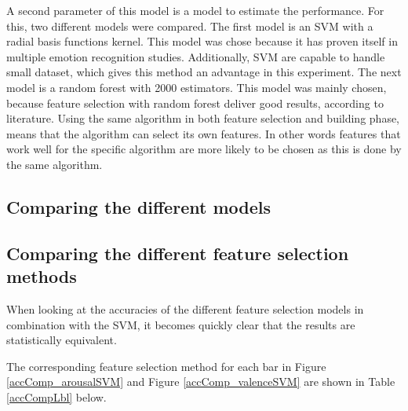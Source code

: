 \npar

A second parameter of this model is a model to estimate the performance. For this, two different models were compared. The first model is an SVM with a radial basis functions kernel. This model was chose because it has proven itself in multiple emotion recognition studies. Additionally, SVM are capable to handle small dataset, which gives this method an advantage in this experiment. The next model is a random forest with 2000 estimators. This model was mainly chosen, because feature selection with random forest deliver good results, according to literature\citep{rfPaper}. Using the same algorithm in both feature selection and building phase, means that the algorithm can select its own features. In other words features that work well for the specific algorithm are more likely to be chosen as this is done by the same algorithm.

\subsection{Comparing the different models}

\subsection{Comparing the different feature selection methods}

When looking at the accuracies of the different feature selection models in combination with the SVM, it becomes quickly clear that the results are statistically equivalent. 

The corresponding feature selection method for each bar in Figure \ref{accComp_arousalSVM} and Figure \ref{accComp_valenceSVM} are shown in Table \ref{accCompLbl} below.



